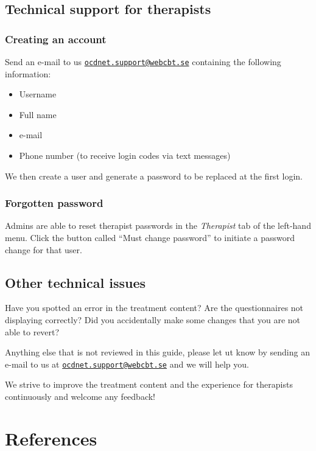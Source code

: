 \documentclass[]{book}
\providecommand{\tightlist}{%
  \setlength{\itemsep}{0pt}\setlength{\parskip}{0pt}}
\theoremstyle{definition}
\theoremstyle{definition}
\theoremstyle{definition}
\theoremstyle{remark}
\begin{document}
\hypertarget{technical-support-for-therapists}{%
\section{Technical support for
therapists}\label{technical-support-for-therapists}}

\hypertarget{creating-an-account}{%
\subsection{Creating an account}\label{creating-an-account}}

Send an e-mail to us
\href{mailto:ocdnet.support@webcbt.se}{\nolinkurl{ocdnet.support@webcbt.se}}
containing the following information:

\begin{itemize}
\tightlist
\item
  Username
\item
  Full name
\item
  e-mail
\item
  Phone number (to receive login codes via text messages)
\end{itemize}

We then create a user and generate a password to be replaced at the
first login.

\hypertarget{forgotten-password}{%
\subsection{Forgotten password}\label{forgotten-password}}

Admins are able to reset therapist passwords in the \emph{Therapist} tab
of the left-hand menu. Click the button called ``Must change password''
to initiate a password change for that user.

\hypertarget{other-technical-issues}{%
\section{Other technical issues}\label{other-technical-issues}}

Have you spotted an error in the treatment content? Are the
questionnaires not displaying correctly? Did you accidentally make some
changes that you are not able to revert?

Anything else that is not reviewed in this guide, please let ut know by
sending an e-mail to us at
\href{mailto:ocdnet.support@webcbt.se}{\nolinkurl{ocdnet.support@webcbt.se}}
and we will help you.

We strive to improve the treatment content and the experience for
therapists continuously and welcome any feedback!

\hypertarget{references}{%
\chapter{References}\label{references}}


\end{document}
